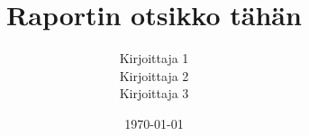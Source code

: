 \documentclass{watson}
\title{Raportin otsikko tähän}
\author{Kirjoittaja 1\\
        Kirjoittaja 2\\
        Kirjoittaja 3}
\date{\today}
\begin{document}
\maketitle
\tableofcontents
\newpage

\pagestyle{headings}





\newpage
\begin{appendix}
  
\end{appendix}

\newpage
\printbibliography
\end{document}
